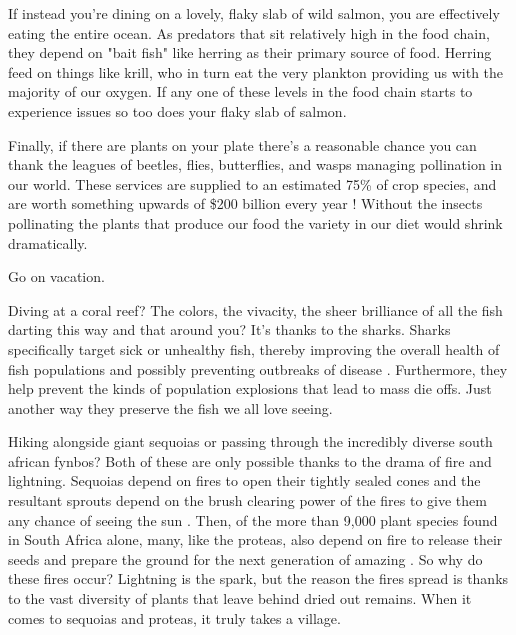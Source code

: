 \documentclass[11pt,a5paper]{book}
\begin{document}
If instead you're dining on a lovely, flaky slab of wild salmon, you are effectively eating the entire ocean. As predators that sit relatively high in the food chain, they depend on "bait fish" like herring as their primary source of food. Herring feed on things like krill, who in turn eat the very plankton providing us with the majority of our oxygen. If any one of these levels in the food chain starts to experience issues so too does your flaky slab of salmon. 
\newline

Finally, if there are plants on your plate there's a reasonable chance you can thank the leagues of beetles, flies, butterflies, and wasps managing pollination in our world. These services are supplied to an estimated 75\% of crop species, and are worth something upwards of \$200 billion every year \cite{avanbergen}! Without the insects pollinating the plants that produce our food the variety in our diet would shrink dramatically.
\newline

Go on vacation. 
\newline

Diving at a coral reef? The colors, the vivacity, the sheer brilliance of all the fish darting this way and that around you? It's thanks to the sharks. Sharks specifically target sick or unhealthy fish, thereby improving the overall health of fish populations and possibly preventing outbreaks of disease \cite{reefcause}. Furthermore, they help prevent the kinds of population explosions that lead to mass die offs. Just another way they preserve the fish we all love seeing. 
\newline

Hiking alongside giant sequoias or passing through the incredibly diverse south african fynbos? Both of these are only possible thanks to the drama of fire and lightning. Sequoias depend on fires to open their tightly sealed cones and the resultant sprouts depend on the brush clearing power of the fires to give them any chance of seeing the sun \cite{california}. Then, of the more than 9,000 plant species found in South Africa alone, many, like the proteas, also depend on fire to release their seeds and prepare the ground for the next generation of amazing \cite{shoek}. So why do these fires occur? Lightning is the spark, but the reason the fires spread is thanks to the vast diversity of plants that leave behind dried out remains. When it comes to sequoias and proteas, it truly takes a village. 
\newline
\end{document}

